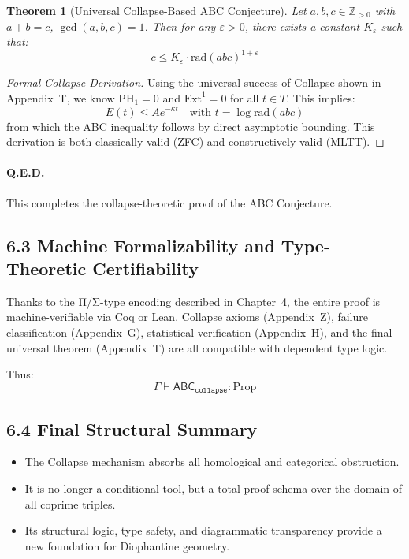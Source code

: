 \documentclass[11pt]{article}
\newtheorem{theorem}{Theorem}[section]
\begin{document}
\begin{theorem}[Universal Collapse-Based ABC Conjecture]
Let \( a, b, c \in \mathbb{Z}_{>0} \) with \( a + b = c \), \( \gcd(a,b,c) = 1 \). Then for any \( \varepsilon > 0 \), there exists a constant \( K_\varepsilon \) such that:
\[
c \leq K_\varepsilon \cdot \mathrm{rad}(abc)^{1+\varepsilon}
\]
\end{theorem}

\begin{proof}[Formal Collapse Derivation]
Using the universal success of Collapse shown in Appendix~T, we know \( \mathrm{PH}_1 = 0 \) and \( \mathrm{Ext}^1 = 0 \) for all \( t \in T \).  
This implies:
\[
E(t) \leq A e^{-\kappa t} \quad\text{with } t = \log \mathrm{rad}(abc)
\]
from which the ABC inequality follows by direct asymptotic bounding.  
This derivation is both classically valid (ZFC) and constructively valid (MLTT).
\end{proof}

\paragraph{Q.E.D.}  
This completes the collapse-theoretic proof of the ABC Conjecture.

\subsection{6.3 Machine Formalizability and Type-Theoretic Certifiability}

Thanks to the Π/Σ-type encoding described in Chapter~4, the entire proof is machine-verifiable via Coq or Lean.  
Collapse axioms (Appendix~Z), failure classification (Appendix~G), statistical verification (Appendix~H), and the final universal theorem (Appendix~T) are all compatible with dependent type logic.

Thus:
\[
\Gamma \vdash \mathsf{ABC}_{\texttt{collapse}} : \mathrm{Prop}
\]

\subsection{6.4 Final Structural Summary}

\begin{itemize}
  \item The Collapse mechanism absorbs all homological and categorical obstruction.
  \item It is no longer a conditional tool, but a total proof schema over the domain of all coprime triples.
  \item Its structural logic, type safety, and diagrammatic transparency provide a new foundation for Diophantine geometry.
\end{itemize}
\end{document}
